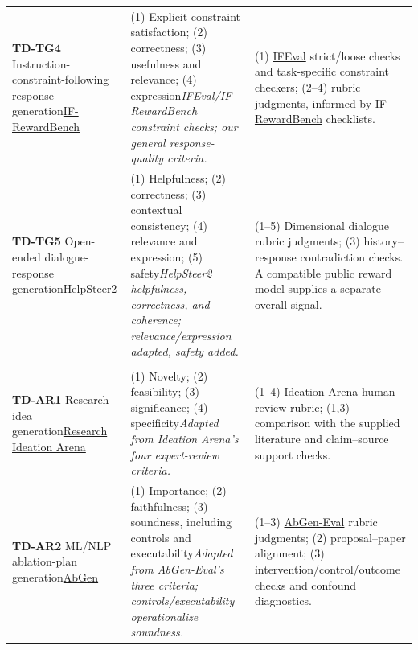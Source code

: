 \begin{longtable}{@{}P{3.45cm}P{3.55cm}P{5.68cm}@{}}
\addlinespace
\textbf{TD-TG4} Instruction-constraint-following response generation\newline \href{https://github.com/thu-coai/IF-RewardBench}{IF-RewardBench} \citep{wen2026ifreward} & (1) Explicit constraint satisfaction; (2) correctness; (3) usefulness and relevance; (4) expression\newline\emph{IFEval/IF-RewardBench constraint checks; our general response-quality criteria.} & (1) \href{https://arxiv.org/abs/2311.07911}{IFEval} \citep{zhou2023ifeval} strict/loose checks and task-specific constraint checkers; (2--4) rubric judgments, informed by \href{https://github.com/thu-coai/IF-RewardBench}{IF-RewardBench} checklists.\\
\addlinespace
\textbf{TD-TG5} Open-ended dialogue-response generation\newline \href{https://huggingface.co/datasets/nvidia/HelpSteer2}{HelpSteer2} \citep{wang2024helpsteer,wang2025helppref} & (1) Helpfulness; (2) correctness; (3) contextual consistency; (4) relevance and expression; (5) safety\newline\emph{HelpSteer2 helpfulness, correctness, and coherence; relevance/expression adapted, safety added.} & (1--5) Dimensional dialogue rubric judgments; (3) history--response contradiction checks. A compatible public reward model supplies a separate overall signal.\\
\addlinespace
{}\\*
\textbf{TD-AR1} Research-idea generation\newline \href{https://huggingface.co/datasets/yolo1213811/research-ideation-arena-dataset}{Research Ideation Arena} \citep{chen2026ideation} & (1) Novelty; (2) feasibility; (3) significance; (4) specificity\newline\emph{Adapted from Ideation Arena's four expert-review criteria.} & (1--4) Ideation Arena human-review rubric; (1,3) comparison with the supplied literature and claim--source support checks.\\
\addlinespace
\textbf{TD-AR2} ML/NLP ablation-plan generation\newline \href{https://huggingface.co/datasets/yale-nlp/AbGen}{AbGen} \citep{zhao2025abgen} & (1) Importance; (2) faithfulness; (3) soundness, including controls and executability\newline\emph{Adapted from AbGen-Eval's three criteria; controls/executability operationalize soundness.} & (1--3) \href{https://huggingface.co/datasets/yale-nlp/AbGen}{AbGen-Eval} rubric judgments; (2) proposal--paper alignment; (3) intervention/control/outcome checks and confound diagnostics.\\

\end{longtable}
